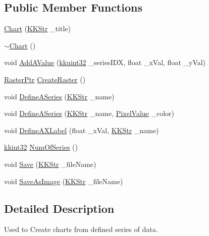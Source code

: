 \subsection*{Public Member Functions}
\begin{DoxyCompactItemize}
\item 
\hyperlink{class_k_k_b_1_1_chart_a3c09af9a78e614e49c6c5f6797d84b96}{Chart} (\hyperlink{class_k_k_b_1_1_k_k_str}{K\+K\+Str} \+\_\+title)
\item 
\hyperlink{class_k_k_b_1_1_chart_aeb7f0a8f4df91162a29b1c0f065b7fc0}{$\sim$\+Chart} ()
\item 
void \hyperlink{class_k_k_b_1_1_chart_a7dd97ebe38931fe5224c4eaccd72a1ae}{Add\+A\+Value} (\hyperlink{namespace_k_k_b_af8d832f05c54994a1cce25bd5743e19a}{kkuint32} \+\_\+series\+I\+DX, float \+\_\+x\+Val, float \+\_\+y\+Val)
\item 
\hyperlink{namespace_k_k_b_a80d46bd24db644a022c863bce8ae3633}{Raster\+Ptr} \hyperlink{class_k_k_b_1_1_chart_a777b2702037e462a704bd0ed2ac89bef}{Create\+Raster} ()
\item 
void \hyperlink{class_k_k_b_1_1_chart_a852f8dd568b6a147ee572d467a83dacf}{Define\+A\+Series} (\hyperlink{class_k_k_b_1_1_k_k_str}{K\+K\+Str} \+\_\+name)
\item 
void \hyperlink{class_k_k_b_1_1_chart_ad90515537a2cb04f96d0ab97eefc7af9}{Define\+A\+Series} (\hyperlink{class_k_k_b_1_1_k_k_str}{K\+K\+Str} \+\_\+name, \hyperlink{class_k_k_b_1_1_pixel_value}{Pixel\+Value} \+\_\+color)
\item 
void \hyperlink{class_k_k_b_1_1_chart_a5e60a43e24f47e728aed3b52896f6263}{Define\+A\+X\+Label} (float \+\_\+x\+Val, \hyperlink{class_k_k_b_1_1_k_k_str}{K\+K\+Str} \+\_\+name)
\item 
\hyperlink{namespace_k_k_b_a8fa4952cc84fda1de4bec1fbdd8d5b1b}{kkint32} \hyperlink{class_k_k_b_1_1_chart_a2dcf8e110bec2184451b0b129d95a40e}{Num\+Of\+Series} ()
\item 
void \hyperlink{class_k_k_b_1_1_chart_afec259cb6df21948506d93b63b36a822}{Save} (\hyperlink{class_k_k_b_1_1_k_k_str}{K\+K\+Str} \+\_\+file\+Name)
\item 
void \hyperlink{class_k_k_b_1_1_chart_acc19b50442a8ef0ad9cfe28c2bdf78a2}{Save\+As\+Image} (\hyperlink{class_k_k_b_1_1_k_k_str}{K\+K\+Str} \+\_\+file\+Name)
\end{DoxyCompactItemize}


\subsection{Detailed Description}
Used to Create chart\textquotesingle{}s from defined series of data. 

